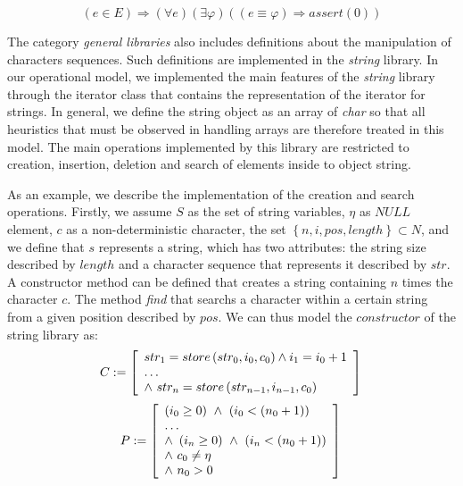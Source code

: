 \documentclass[a4paper]{llncs}
\begin{document}
\begin{equation}
\label{stdexcept}
\left( e \in E \right)
\Rightarrow \left(\forall e\right)\left(\exists\varphi\right)\left(\left(e\equiv\varphi\right)
\Rightarrow assert\left(0\right)\right)
\end{equation}

The category \textit{general libraries} also includes definitions
about the manipulation of characters sequences. Such definitions
are implemented in the \textit{string} library. In our operational
model, we implemented the main features of the \textit{string}
library through the iterator class that contains the
representation of the iterator for strings. In general,
we define the string object as an array of \textit{char} so that all
heuristics that must be observed in handling arrays are therefore
treated in this model. The main operations implemented by this library
are restricted to creation, insertion, deletion and search of elements
inside to object string.

As an example, we describe the implementation of the creation and search
operations. Firstly, we assume $S$ as the set of string variables,
$\eta$ as $NULL$ element, $c$ as a non-deterministic character,
the set $\left\{n, i, pos, length\right\} \subset N$,
and we define that $s$ represents a string, which has two attributes:
the string size described by $length$ and a character sequence that
represents it described by $str$. A constructor method can be defined
that creates a string containing $n$ times the character $c$. The method
\textit{find} that searchs a character within a certain string from a
given position described by $pos$. We can thus model the $constructor$
of the string library as:
%
\begin{equation}
\label{cconstructor-string}
C := \left [ \begin{array}{ll}
                str_{1} = store\left(str_{0}, i_{0}, c_{0}\right) \wedge i_{1} = i_{0} + 1  \\
		\ldots \\
		\wedge \, \, str_{n} = store\left(str_{n-1}, i_{n-1}, c_{0}\right)
              \end{array} \right ]  \\
\end{equation}
%
\begin{equation}
\label{pconstructor-string}
P := \left [ \begin{array}{ll}
                \left(i_{0} \geq 0\right)  \, \, \wedge \, \, \left(i_{0} < \left(n_{0} + 1\right)\right)\\
                \ldots \\
                \wedge \, \, \left(i_{n} \geq 0\right)  \, \, \wedge \, \, \left(i_{n} < \left(n_{0} + 1\right)\right)\\
                \wedge \, \, c_{0} \neq \eta\\
                \wedge \, \, n_{0} > 0\\
              \end{array} \right ]  \\
\end{equation}
\end{document}
